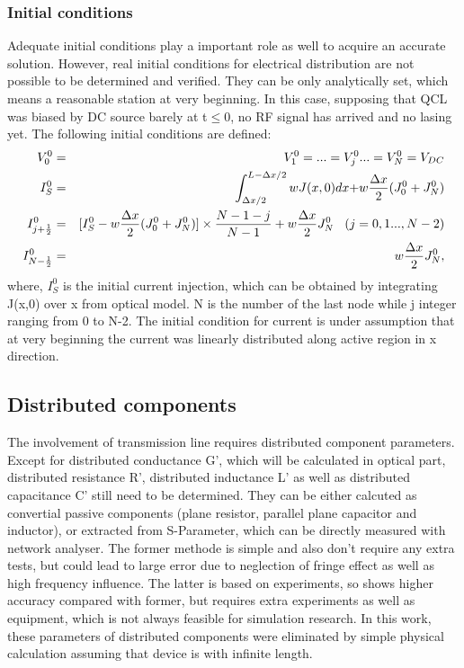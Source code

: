 \documentclass[11pt,final]{scrbook}
\begin{document}
\subsubsection{Initial conditions}
Adequate initial conditions play a important role as well to acquire an accurate solution. However, real initial conditions for electrical distribution are not possible to be determined and verified. They can be only analytically set, which means a reasonable station at very beginning. In this case, supposing that QCL was biased by DC source barely at t$\leqslant 0$, no RF signal has arrived and no lasing yet. The following initial conditions are defined:
\begin{eqnarray}
V_{0}^{0} &=& V_{1}^{0} =...=V_{j}^{0}...=V_{N}^{0} = V_{DC}\\
I_{S}^{0}&=&\int _{ \Delta x/2 }^{ L-\Delta x/2 }{ wJ(x,0)dx+ } w\frac { \Delta x }{ 2 } (J_{ 0 }^{ 0 }+J_{ N }^{ 0 })\label{Eqn. Is}\\
I_{j+\frac{1}{2}}^{0} &=& [I_{S}^{0}-w\frac{\Delta x}{2}(J_{0}^{0}+J_{N}^{0})]\times \frac{N-1-j}{N-1}+w\frac{\Delta x}{2}J_{N}^{0} \hspace{3mm} (j=0,1...,N-2)\\
I_{N-\frac{1}{2}}^{0}&=&w\frac{\Delta x}{2}J_{N}^{0},
\end{eqnarray}
where, $I_{S}^{0}$ is the initial current injection, which can be obtained by integrating J(x,0) over x from optical model. N is the number of the last node while j integer ranging from 0 to N-2. The initial condition for current is under assumption that at very beginning the current was linearly distributed along active region in x direction.

\subsection{Distributed components}
The involvement of transmission line requires distributed component parameters. Except for distributed conductance G', which will be calculated in optical part, distributed resistance R', distributed inductance L' as well as distributed capacitance C' still need to be determined. They can be either calcuted as convertial passive components (plane resistor, parallel plane capacitor and inductor), or extracted from S-Parameter, which can be directly measured with network analyser. The former methode is simple and also don't require any extra tests, but could lead to large error due to neglection of fringe effect\cite{pillai1970fringing} as well as high frequency influence. The latter is based on experiments, so shows higher accuracy compared with former, but requires extra experiments as well as equipment, which is not always feasible for simulation research. In this work, these parameters of distributed components were eliminated by simple physical calculation assuming that device is with infinite length.
\end{document}
